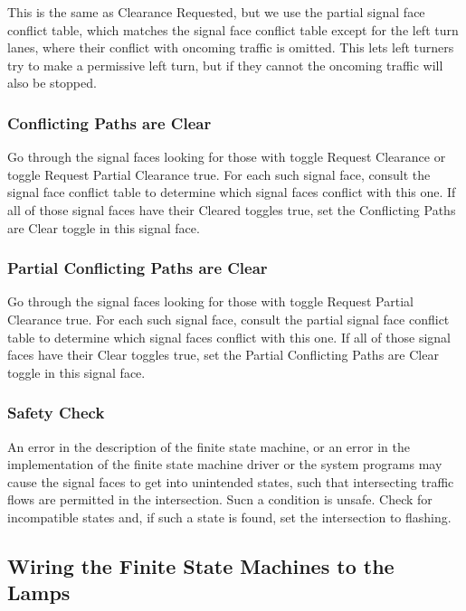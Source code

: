 \documentclass[letterpaper,twoside]{article}
\begin{document}
This is the same as Clearance Requested, but we use the partial signal face
conflict table, which matches the signal face conflict table except
for the left turn lanes, where their conflict with oncoming traffic is
omitted.
This lets left turners try to make a
permissive left turn, but if they cannot the oncoming traffic will also
be stopped.

\subsubsection{Conflicting Paths are Clear}

Go through the signal faces looking for those with toggle Request Clearance
or toggle Request Partial Clearance
true.  For each such signal face, consult the signal face conflict table
to determine which signal faces conflict with this one.  If all of those
signal faces have their Cleared toggles true, set the Conflicting Paths
are Clear toggle in this signal face.

\subsubsection{Partial Conflicting Paths are Clear}

Go through the signal faces looking for those with toggle Request Partial
Clearance true.  For each such signal face, consult the partial
signal face conflict table to determine which signal faces conflict
with this one.  If all of those signal faces have their Clear toggles
true, set the Partial Conflicting Paths are Clear toggle in this
signal face.

\subsubsection{Safety Check}

An error in the description of the finite state machine, or an error
in the implementation of the finite state machine driver or the
system programs may cause the signal faces to get into unintended
states, such that intersecting traffic flows are permitted in the
intersection.  Sucn a condition is unsafe.  Check for incompatible
states and, if such a state is found, set the intersection to flashing.

\subsection{Wiring the Finite State Machines to the Lamps}
\end{document}

